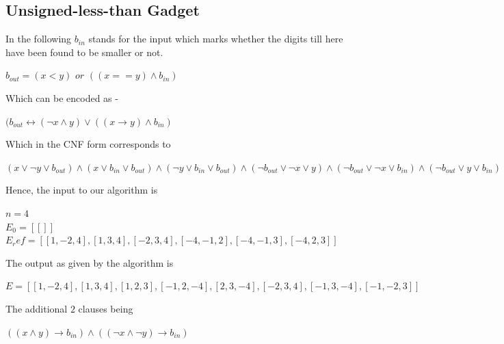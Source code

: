 \documentclass{article}
\theoremstyle{plain}
\begin{document}
\subsection{Unsigned-less-than Gadget}
In the following $b_{in}$ stands for the input which marks whether the digits till here have been found to be smaller or not.
\begin{center}
$b_{out} = (x < y)$ $or$ $((x == y) \wedge b_{in})$   
\end{center}
Which can be encoded as -
\begin{center}
$ (b_{out} \longleftrightarrow (\neg x \wedge y) \vee ((x \longrightarrow y) \wedge b_{in})$  
\end{center}
Which in the CNF form corresponds to
\begin{center}
$(x \vee \neg y \vee b_{out}) \wedge (x \vee b_{in} \vee b_{out}) \wedge (\neg y \vee b_{in} \vee b_{out}) \wedge (\neg b_{out} \vee \neg x \vee y) \wedge (\neg b_{out} \vee \neg x \vee b_{in}) \wedge (\neg b_{out} \vee y \vee b_{in})$
\end{center}
Hence, the input to our algorithm is
\begin{center}
$n = 4$\\
$E_0 = [[]]$ \\
$E_ref = [[1,-2,4],[1,3,4],[-2,3,4],[-4,-1,2],[-4,-1,3],[-4,2,3]]$
\end{center}
The output as given by the algorithm is 
\begin{center}
$E = [[1,-2,4],[1,3,4],[1,2,3],[-1,2,-4],[2,3,-4],[-2,3,4],[-1,3,-4],[-1,-2,3]]$
\end{center}
The additional $2$ clauses being 
\begin{center}
$((x \wedge y) \longrightarrow b_{in}) \wedge ((\neg x \wedge \neg y) \longrightarrow b_{in})$
\end{center}
\nocite{*}


\end{document}
